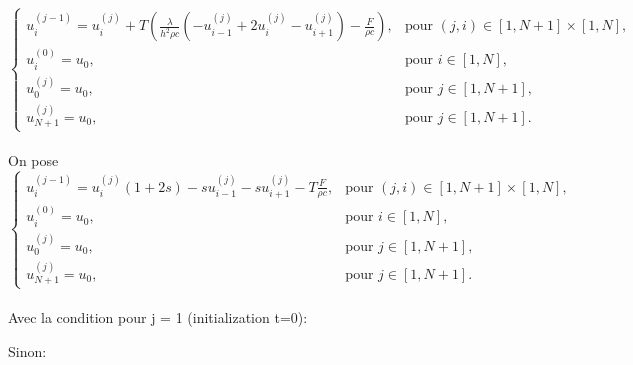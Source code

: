\documentclass{article}
\begin{document}
\begin{equation}
\begin{cases}
    u_i^{(j-1)} = u_i^{(j)} +T(\frac{\lambda}{h^2\rho c} (-{u_{i-1}^{(j)} + 2u_i^{(j)} - u_{i+1}^{(j)}}) - \frac{F}{\rho c}), & \text{pour } (j, i) \in [1, N+1] \times [1, N], \\
    u_i^{(0)} = u_0, & \text{pour } i \in [1, N], \\
    u_0^{(j)}=u_0, & \text{pour } j \in [1,N+1], \\
    u_{N+1}^{(j)} = u_0, & \text{pour } j \in [1, N+1].
\end{cases}
\end{equation}
\\On pose \\
\begin{equation}
\begin{cases}
    u_i^{(j-1)} = u_i^{(j)}(1+2s) -s{u_{i-1}^{(j)} - su_{i+1}^{(j)}} - T\frac{F}{\rho c}, & \text{pour } (j, i) \in [1,N+1] \times [1,N], \\
    u_i^{(0)} = u_0, & \text{pour } i \in [1, N], \\
    u_0^{(j)}=u_0, & \text{pour } j \in [1, N+1], \\
    u_{N+1}^{(j)} = u_0, & \text{pour } j \in [1, N+1].
\end{cases}
\end{equation}
\\Avec la condition pour j = 1 (initialization  t=0):\\
\begin{center}
\end{center}
Sinon:
\end{document}
